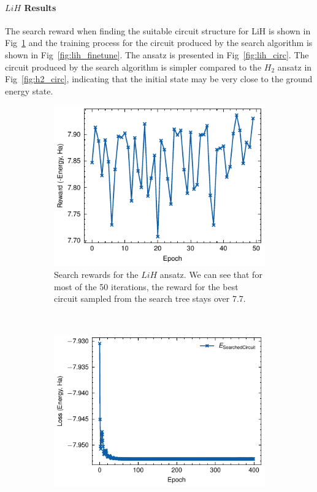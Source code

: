 \documentclass[a4paper,onecolumn,11pt]{quantumarticle}
\begin{document}
\paragraph{$LiH$ Results} The search reward when finding the suitable circuit structure for LiH is shown in Fig~\ref{fig:lih_search} and the training process for the circuit produced by the search algorithm is shown in Fig~\ref{fig:lih_finetune}. The ansatz is presented in Fig~\ref{fig:lih_circ}. The circuit produced by the search algorithm is simpler compared to the $H_2$ ansatz in Fig~\ref{fig:h2_circ}, indicating that the initial state may be very close to the ground energy state.
\begin{figure}[H]
    \centering
    \begin{subfigure}[t]{0.48\textwidth}
        \includegraphics[width=\textwidth]{Figures/fig_lih_search_rewards.pdf}
        \caption{Search rewards for the $LiH$ ansatz. We can see that for most of the 50 iterations, the reward for the best circuit sampled from the search tree stays over 7.7.}
        \label{fig:lih_search}
    \end{subfigure}
    ~ %
    \begin{subfigure}[t]{0.48\textwidth}
        \includegraphics[width=\textwidth]{Figures/fig_lih_fine_tune_loss.pdf}

\end{subfigure}
\end{figure}
\end{document}
